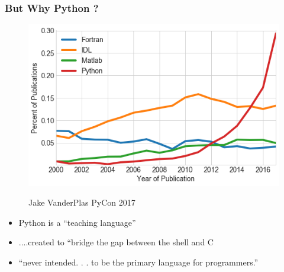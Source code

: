 \documentclass{bredelebeamer}
\begin{document}
\begin{frame}\frametitle{But Why Python ?}
\begin{multicols}{2}
\begin{figure}[h]
		\includegraphics[scale=0.30]{../image/whypython.png}
		\label{fig:result1}
		\caption{Jake VanderPlas PyCon 2017}
\end{figure}
\columnbreak
\begin{itemize}
	\item Python is a “teaching language”
	\item ....created to “bridge the gap between the shell and C
	\item  “never intended. . . to be the primary language for programmers.”
\end{itemize}

\end{multicols}	
\end{frame}	
\end{document}
